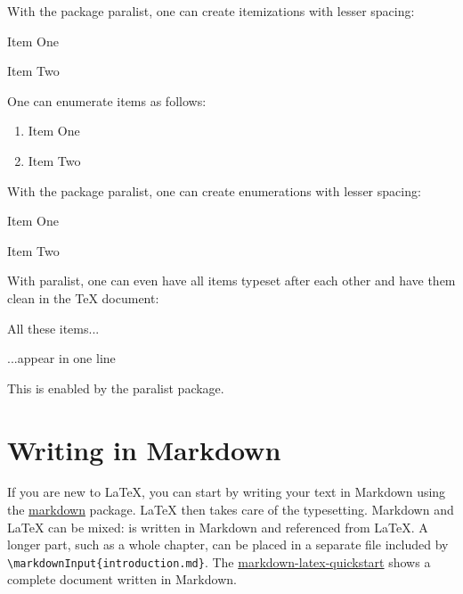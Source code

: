 With the package paralist, one can create itemizations with lesser spacing:

\begin{ltgexample}
\begin{compactitem}
  \item Item One
  \item Item Two
\end{compactitem}
\end{ltgexample}

One can enumerate items as follows:

\begin{ltgexample}
\begin{enumerate}
  \item Item One
  \item Item Two
\end{enumerate}
\end{ltgexample}

With the package paralist, one can create enumerations with lesser spacing:

\begin{ltgexample}
\begin{compactenum}
  \item Item One
  \item Item Two
\end{compactenum}
\end{ltgexample}

With paralist, one can even have all items typeset after each other and have them clean in the TeX document:

\begin{ltgexample}
\begin{inparaenum}
  \item All these items...
  \item ...appear in one line
  \item This is enabled by the paralist package.
\end{inparaenum}
\end{ltgexample}

\section{Writing in Markdown}\label{sec:markdown}

\ifluatex
  If you are new to \LaTeX{}, you can start by writing your text in Markdown using the \href{https://ctan.org/pkg/markdown}{markdown} package.
  \LaTeX{} then takes care of the typesetting.
  Markdown and \LaTeX{} can be mixed:
   is written in Markdown and referenced from \LaTeX{}.
  A longer part, such as a whole chapter, can be placed in a separate file included by \verb|\markdownInput{introduction.md}|.
  The \href{https://github.com/latextemplates/markdown-latex-quickstart}{markdown-latex-quickstart} shows a complete document written in Markdown.

